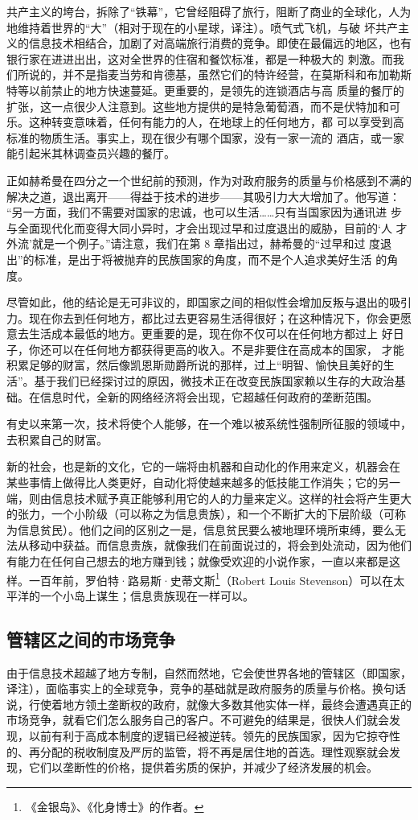 共产主义的垮台，拆除了“铁幕”，它曾经阻碍了旅行，阻断了商业的全球化，人为地维持着世界的“大”（相对于现在的小星球，译注）。喷气式飞机，与破 坏共产主义的信息技术相结合，加剧了对高端旅行消费的竞争。即使在最偏远的地区，也有银行家在进进出出，这对全世界的住宿和餐饮标准，都是一种极大的 刺激。而我们所说的，并不是指麦当劳和肯德基，虽然它们的特许经营，在莫斯科和布加勒斯特等以前禁止的地方快速蔓延。更重要的，是领先的连锁酒店与高 质量的餐厅的扩张，这一点很少人注意到。这些地方提供的是特急葡萄酒，而不是伏特加和可乐。这种转变意味着，任何有能力的人，在地球上的任何地方，都 可以享受到高标准的物质生活。事实上，现在很少有哪个国家，没有一家一流的 酒店，或一家能引起米其林调查员兴趣的餐厅。

正如赫希曼在四分之一个世纪前的预测，作为对政府服务的质量与价格感到不满的解决之道，退出离开——得益于技术的进步——其吸引力大大增加了。他写道： “另一方面，我们不需要对国家的忠诚，也可以生活……只有当国家因为通讯进 步与全面现代化而变得大同小异时，才会出现过早和过度退出的威胁，目前的‘人 才外流’就是一个例子。”请注意，我们在第 8 章指出过，赫希曼的“过早和过 度退出”的标准，是出于将被抛弃的民族国家的角度，而不是个人追求美好生活 的角度。

尽管如此，他的结论是无可非议的，即国家之间的相似性会增加反叛与退出的吸引力。现在你去到任何地方，都比过去更容易生活得很好；在这种情况下，你会更愿意去生活成本最低的地方。更重要的是，现在你不仅可以在任何地方都过上 好日子，你还可以在任何地方都获得更高的收入。不是非要住在高成本的国家， 才能积累足够的财富，然后像凯恩斯勋爵所说的那样，过上“明智、愉快且美好的生活”。基于我们已经探讨过的原因，微技术正在改变民族国家赖以生存的大政治基础。在信息时代，全新的网络经济将会出现，它超越任何政府的垄断范围。

有史以来第一次，技术将使个人能够，在一个难以被系统性强制所征服的领域中， 去积累自己的财富。

新的社会，也是新的文化，它的一端将由机器和自动化的作用来定义，机器会在 某些事情上做得比人类更好，自动化将使越来越多的低技能工作消失；它的另一端，则由信息技术赋予真正能够利用它的人的力量来定义。这样的社会将产生更大的张力，一个小阶级（可以称之为信息贵族），和一个不断扩大的下层阶级（可称为信息贫民）。他们之间的区别之一是，信息贫民要么被地理环境所束缚，要么无法从移动中获益。而信息贵族，就像我们在前面说过的，将会到处流动，因为他们有能力在任何自己想去的地方赚到钱；就像受欢迎的小说作家，一直以来都是这样。一百年前，罗伯特·路易斯·史蒂文斯\footnote{《金银岛》、《化身博士》的作者。}（Robert Louis Stevenson）可以在太平洋的一个小岛上谋生；信息贵族现在一样可以。

\subsection{管辖区之间的市场竞争}
由于信息技术超越了地方专制，自然而然地，它会使世界各地的管辖区（即国家，译注），面临事实上的全球竞争，竞争的基础就是政府服务的质量与价格。换句话说，行使着地方领土垄断权的政府，就像大多数其他实体一样，最终会遭遇真正的市场竞争，就看它们怎么服务自己的客户。不可避免的结果是，很快人们就会发现，以前有利于高成本制度的逻辑已经被逆转。领先的民族国家，因为它掠夺性的、再分配的税收制度及严厉的监管，将不再是居住地的首选。理性观察就会发现，它们以垄断性的价格，提供着劣质的保护，并减少了经济发展的机会。

